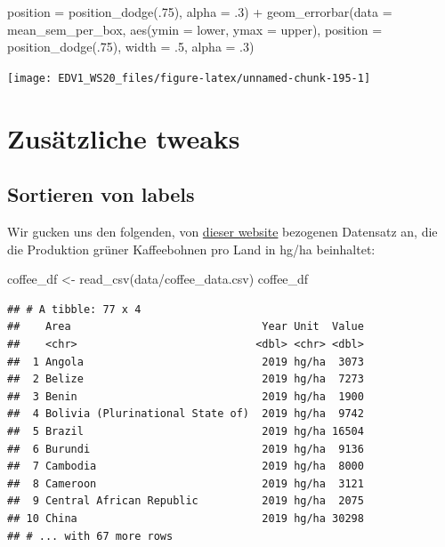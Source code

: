 \documentclass[
]{book}
\newenvironment{Shaded}{\begin{snugshade}}{\end{snugshade}}
\newcommand{\AttributeTok}[1]{\textcolor[rgb]{0.77,0.63,0.00}{#1}}
\newcommand{\DecValTok}[1]{\textcolor[rgb]{0.00,0.00,0.81}{#1}}
\newcommand{\FunctionTok}[1]{\textcolor[rgb]{0.00,0.00,0.00}{#1}}
\newcommand{\NormalTok}[1]{#1}
\newcommand{\OtherTok}[1]{\textcolor[rgb]{0.56,0.35,0.01}{#1}}
\newcommand{\SpecialCharTok}[1]{\textcolor[rgb]{0.00,0.00,0.00}{#1}}
\newcommand{\StringTok}[1]{\textcolor[rgb]{0.31,0.60,0.02}{#1}}
\begin{document}
\begin{Shaded}
\begin{Highlighting}[]
             \AttributeTok{position =} \FunctionTok{position\_dodge}\NormalTok{(.}\DecValTok{75}\NormalTok{),}
             \AttributeTok{alpha =}\NormalTok{ .}\DecValTok{3}\NormalTok{) }\SpecialCharTok{+}
  \FunctionTok{geom\_errorbar}\NormalTok{(}\AttributeTok{data =}\NormalTok{ mean\_sem\_per\_box,}
                \FunctionTok{aes}\NormalTok{(}\AttributeTok{ymin =}\NormalTok{ lower,}
                    \AttributeTok{ymax =}\NormalTok{ upper),}
             \AttributeTok{position =} \FunctionTok{position\_dodge}\NormalTok{(.}\DecValTok{75}\NormalTok{),}
             \AttributeTok{width =}\NormalTok{ .}\DecValTok{5}\NormalTok{,}
             \AttributeTok{alpha =}\NormalTok{ .}\DecValTok{3}\NormalTok{) }
\end{Highlighting}
\end{Shaded}

\begin{center}\texttt{[image: EDV1\_WS20\_files/figure-latex/unnamed-chunk-195-1]} \end{center}

\hypertarget{zusuxe4tzliche-tweaks}{%
\section{Zusätzliche tweaks}\label{zusuxe4tzliche-tweaks}}

\hypertarget{sortieren-von-labels}{%
\subsection{Sortieren von labels}\label{sortieren-von-labels}}

Wir gucken uns den folgenden, von \href{http://www.fao.org/faostat/en/\#data/QC}{dieser website} bezogenen Datensatz an, die die Produktion grüner Kaffeebohnen pro Land in hg/ha beinhaltet:

\begin{Shaded}
\begin{Highlighting}[]
\NormalTok{coffee\_df }\OtherTok{\textless{}{-}} \FunctionTok{read\_csv}\NormalTok{(}\StringTok{\textquotesingle{}data/coffee\_data.csv\textquotesingle{}}\NormalTok{) }
\NormalTok{coffee\_df}
\end{Highlighting}
\end{Shaded}

\begin{verbatim}
## # A tibble: 77 x 4
##    Area                              Year Unit  Value
##    <chr>                            <dbl> <chr> <dbl>
##  1 Angola                            2019 hg/ha  3073
##  2 Belize                            2019 hg/ha  7273
##  3 Benin                             2019 hg/ha  1900
##  4 Bolivia (Plurinational State of)  2019 hg/ha  9742
##  5 Brazil                            2019 hg/ha 16504
##  6 Burundi                           2019 hg/ha  9136
##  7 Cambodia                          2019 hg/ha  8000
##  8 Cameroon                          2019 hg/ha  3121
##  9 Central African Republic          2019 hg/ha  2075
## 10 China                             2019 hg/ha 30298
## # ... with 67 more rows
\end{verbatim}
\end{document}
